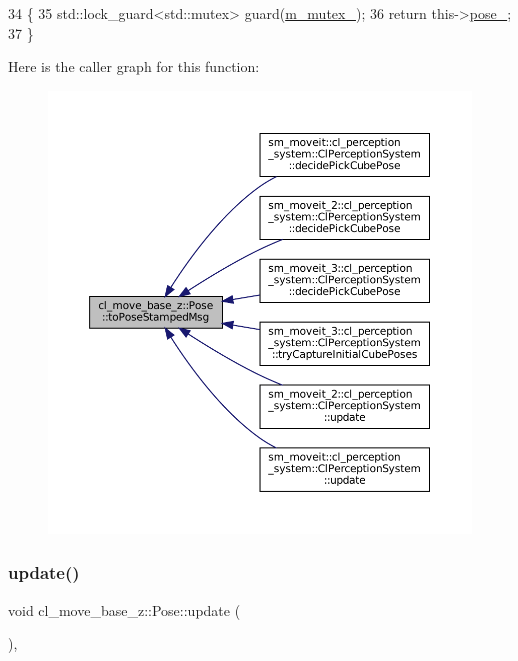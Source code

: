 \begin{DoxyCode}
34     \{
35         std::lock\_guard<std::mutex> guard(\hyperlink{classcl__move__base__z_1_1Pose_a73ed2daba3e473e156cab751fb37b58f}{m\_mutex\_});
36         \textcolor{keywordflow}{return} this->\hyperlink{classcl__move__base__z_1_1Pose_a9da7acf880968a3c220b8436fd0bb6ef}{pose\_};
37     \}
\end{DoxyCode}
Here is the caller graph for this function\+:
\nopagebreak
\begin{figure}[H]
\begin{center}
\leavevmode
\includegraphics[width=350pt]{classcl__move__base__z_1_1Pose_a63887a88c1ac6e9a4a71b8d7d11aed6c_icgraph}
\end{center}
\end{figure}
\mbox{\label{classcl__move__base__z_1_1Pose_abf99d1127cf51a93f97ada2031196114}} 
\subsubsection{\texorpdfstring{update()}{update()}}
{\footnotesize\ttfamily void cl\+\_\+move\+\_\+base\+\_\+z\+::\+Pose\+::update (\begin{DoxyParamCaption}{ }\end{DoxyParamCaption})\hspace{0.3cm}{\ttfamily [override]}, {\ttfamily [virtual]}}



